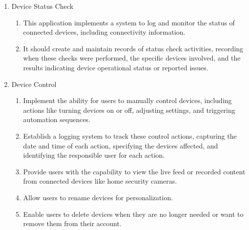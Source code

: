 \begin{enumerate}[label=\arabic*.]
\begin{enumerate}[label*={\arabic*.}]
                  \item {\large{Device Status Check}}\\
                        \begin{enumerate}[label*={\arabic*.},ref=\theenumi.\arabic*]
                              \setlength{\itemindent}{0.5cm}
                              \item This application implements a system to log and monitor the status of connected devices, including connectivity information.\\
                              \item It should create and maintain records of status check activities, recording when these checks were performed, the specific devices involved, and the results indicating device operational status or reported issues.\\
                        \end{enumerate}

                  \item {\large{Device Control}}\\
                        \begin{enumerate}[label*={\arabic*.},ref=\theenumi.\arabic*]
                              \setlength{\itemindent}{0.5cm}
                              \item  Implement the ability for users to manually control devices, including actions like turning devices on or off, adjusting settings, and triggering automation sequences.\\
                              \item Establish a logging system to track these control actions, capturing the date and time of each action, specifying the devices affected, and identifying the responsible user for each action.\\
                              \item Provide users with the capability to view the live feed or recorded content from connected devices like home security cameras.\\
                              \item Allow users to rename devices for personalization.\\
                              \item Enable users to delete devices when they are no longer needed or want to remove them from their account.\\
                        \end{enumerate}
            \end{enumerate}


\end{enumerate}
